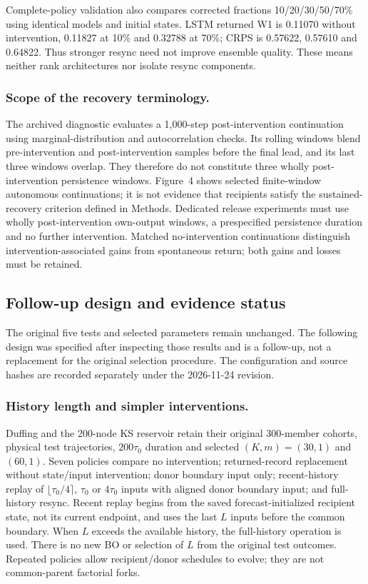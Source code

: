 \documentclass[gmd,manuscript]{copernicus}
\begin{document}
Complete-policy validation also compares corrected fractions 10/20/30/50/70\% using identical models and initial states. LSTM returned W1 is 0.11070 without intervention, 0.11827 at 10\% and 0.32788 at 70\%; CRPS is 0.57622, 0.57610 and 0.64822. Thus stronger resync need not improve ensemble quality. These means neither rank architectures nor isolate resync components.

\subsubsection{Scope of the recovery terminology.}
The archived diagnostic evaluates a 1,000-step post-intervention continuation using marginal-distribution and autocorrelation checks. Its rolling windows blend pre-intervention and post-intervention samples before the final lead, and its last three windows overlap. They therefore do not constitute three wholly post-intervention persistence windows. Figure~4 shows selected finite-window autonomous continuations; it is not evidence that recipients satisfy the sustained-recovery criterion defined in Methods. Dedicated release experiments must use wholly post-intervention own-output windows, a prespecified persistence duration and no further intervention. Matched no-intervention continuations distinguish intervention-associated gains from spontaneous return; both gains and losses must be retained.

\subsection{Follow-up design and evidence status}\label{app:note13}
The original five tests and selected parameters remain unchanged. The following design was specified after inspecting those results and is a follow-up, not a replacement for the original selection procedure. The configuration and source hashes are recorded separately under the 2026-11-24 revision.

\subsubsection{History length and simpler interventions.}
Duffing and the 200-node KS reservoir retain their original 300-member cohorts, physical test trajectories, $200\tau_0$ duration and selected $(K,m)=(30,1)$ and $(60,1)$. Seven policies compare no intervention; returned-record replacement without state/input intervention; donor boundary input only; recent-history replay of $\lfloor\tau_0/4\rceil$, $\tau_0$ or $4\tau_0$ inputs with aligned donor boundary input; and full-history resync. Recent replay begins from the saved forecast-initialized recipient state, not its current endpoint, and uses the last $L$ inputs before the common boundary. When $L$ exceeds the available history, the full-history operation is used. There is no new BO or selection of $L$ from the original test outcomes. Repeated policies allow recipient/donor schedules to evolve; they are not common-parent factorial forks.
\end{document}
